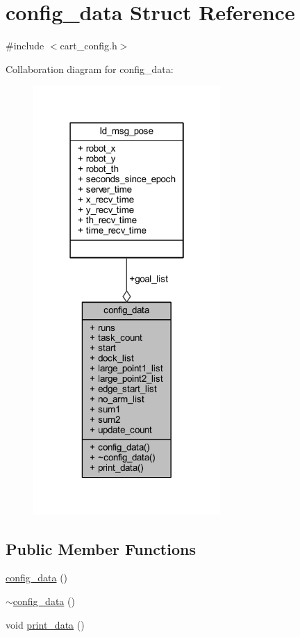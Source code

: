 \hypertarget{structconfig__data}{}\section{config\+\_\+data Struct Reference}
\label{structconfig__data}


{\ttfamily \#include $<$cart\+\_\+config.\+h$>$}



Collaboration diagram for config\+\_\+data\+:\nopagebreak
\begin{figure}[H]
\begin{center}
\leavevmode
\includegraphics[width=202pt]{structconfig__data__coll__graph}
\end{center}
\end{figure}
\subsection*{Public Member Functions}
\begin{DoxyCompactItemize}
\item 
\mbox{\hyperlink{structconfig__data_abd628560b6b09ef4b0529e8572f24f9e}{config\+\_\+data}} ()
\item 
\mbox{\hyperlink{structconfig__data_aed1555d45e92f85719bc56eed907c240}{$\sim$config\+\_\+data}} ()
\item 
void \mbox{\hyperlink{structconfig__data_a7131e30339dc86bc7e0f8c211e1a7f87}{print\+\_\+data}} ()
\end{DoxyCompactItemize}
